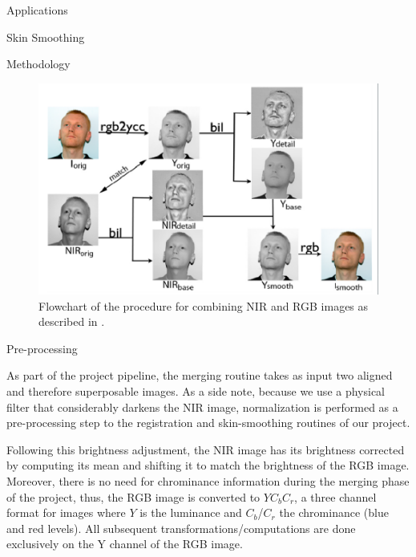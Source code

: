 \documentclass[10pt]{article}
\begin{document}
\begin{section}{Applications}
\begin{subsection}{Skin Smoothing}
\begin{subsubsection}{Methodology}
            \begin{figure}[!h]
                \begin{center}
                    \includegraphics[width=\textwidth]{fig/flowchart.png}
                    \caption{Flowchart of the procedure for combining NIR and RGB images as described in \cite{skin}.}
                    \label{fig:merging_algorithm}
                \end{center}
            \end{figure}

        \end{subsubsection}

        \begin{subsubsection}{Pre-processing}

            As part of the project pipeline, the merging routine takes as input two aligned and therefore superposable images. As a side note, because we use a physical filter that considerably darkens the NIR image, normalization is performed as a pre-processing step to the registration and skin-smoothing routines of our project.

            \medskip

            Following this brightness adjustment, the NIR image has its brightness corrected by computing its mean and shifting it to match the brightness of the RGB image. Moreover, there is no need for chrominance information during the merging phase of the project, thus, the RGB image is converted to $Y C_b C_r$, a three channel format for images where $Y$ is the luminance and $C_b$/$C_r$ the chrominance (blue and red levels). All subsequent transformations/computations are done exclusively on the Y channel of the RGB image.

        \end{subsubsection}


\end{subsection}
\end{section}
\end{document}
